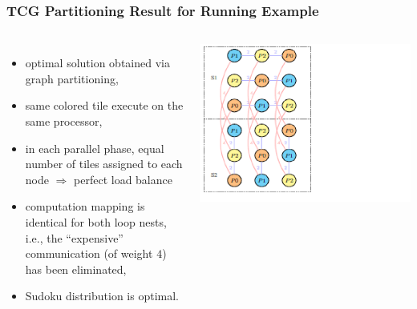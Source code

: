 \documentclass{beamer}
\newcommand{\emp}[1]{\textcolor{DikuRed}{ #1}}
\begin{document}
\begin{frame}[fragile,t]
  \frametitle{TCG Partitioning Result for Running Example}


\begin{columns}
\begin{itemize}
    \item optimal solution obtained via graph partitioning,
    \item same colored tile execute on the same processor,
    \item in each parallel phase, equal number of tiles
            assigned to each node $\Rightarrow$ perfect 
            load balance
    \item computation mapping is identical for both loop nests,
            i.e., the ``expensive'' communication (of weight $4$)
            has been eliminated,
    \item \emp{Sudoku} distribution is optimal.
\end  {itemize}
\includegraphics[width=59ex]{Figures/TCGresultADI}
\end{columns}

\end{frame}
\end{document}
